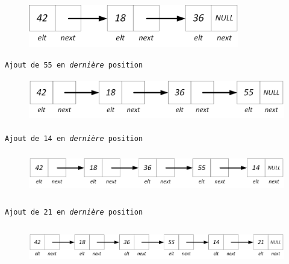 \documentclass[11pt,a4paper]{article}
\begin{document}
\begin{figure}[ht!]
\centering
\centerline{  %
\includegraphics[height=1.85cm]{img/Liste_p_1.png}
}
\end{figure}

\begin{center}

\texttt{Ajout de 55 en \textit{dernière} position}

\begin{figure}[ht!]
\centering
\centerline{  %
\includegraphics[height=1.85cm]{img/f-1-Liste_p_4.png}
}
\end{figure}


\texttt{Ajout de 14 en \textit{dernière} position}

\begin{figure}[ht!]
\centering
\centerline{  %
\includegraphics[height=1.85cm]{img/f-2-Liste_p_5.png}
}
\end{figure}


\texttt{Ajout de 21 en \textit{dernière} position}

\begin{figure}[ht!]
\centering
\centerline{  %
\includegraphics[height=1.85cm]{img/f-3-Liste_p_6.png}
}
\end{figure}



\end{center}
\end{document}
